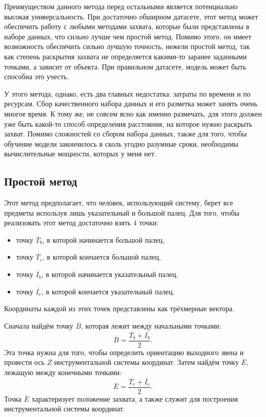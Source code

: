 \documentclass[14pt, a4paper]{extarticle}
\begin{document}
Преимуществом данного метода перед остальными является потенциально высокая
универсальность. При достаточно обширном датасете, этот метод может обеспечить
работу с любыми методами захвата, которые были представлены в наборе данных,
что сильно лучше чем простой метод. Помимо этого, он имеет возможность
обеспечить сильно лучшую точность, нежели простой метод, так как степень
раскрытия захвата не определяется какими-то заранее заданными точками, а
зависит от объекта. При правильном датасете, модель может быть способна это
учесть.

У этого метода, однако, есть два главных недостатка: затраты по времени и по
ресурсам. Сбор качественного набора данных и его разметка может занять очень
многое время. К тому же, не совсем ясно как именно размечать, для этого должен
уже быть какой-то способ определения расстояния, на которое нужно раскрыть
захват. Помимо сложностей со сбором набора данных, также для того, чтобы
обучение модели закончилось в сколь угодно разумные сроки, необходимы
вычислительные мощности, которых у меня нет.

\subsection{Простой метод}
\label{sec:gripper_basic_method}
Этот метод предполагает, что человек, использующий систему, берет все предметы
используя лишь указательный и большой палец. 
Для того, чтобы реализовать этот метод достаточно взять 4 точки:
\begin{itemize}
  \item точку $\overline{T_b}$, в которой начинается большой палец,
  \item точку $\overline{T_e}$, в которой кончается большой палец,
  \item точку $\overline{I_b}$, в которой начинается указательный палец,
  \item точку $\overline{I_e}$, в которой кончается указательный палец.
\end{itemize}
Координаты каждой из этих точек представлены как трёхмерные вектора.

Сначала найдём точку $\overline{B}$, которая лежит между начальными точками:
\begin{equation}
  \overline{B} = \frac{\overline{T_b} + \overline{I_b}}{2}.
\end{equation}
Эта точка нужна для того, чтобы определить ориентацию выходного звена и
провести ось $Z$ инструментальной системы координат.
Затем найдём точку $\overline{E}$, лежащую между конечными точками:
\begin{equation}
  \overline{E} = \frac{\overline{T_e} + \overline{I_e}}{2}.
\end{equation}
Точка $\overline{E}$ характеризует положение захвата, а также служит для
построения инструментальной системы координат.
\end{document}
